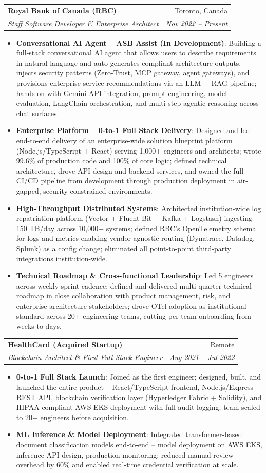 \documentclass[letterpaper,9.5pt]{article}
\makeatletter
\newcommand{\resumeItem}[2]{\item\small{\textbf{#1}{: #2 \vspace{-2pt}}}}
\newcommand{\resumeSubheading}[4]{\vspace{-2pt}\item\begin{tabular*}{0.97\textwidth}{l@{\extracolsep{\fill}}r}\textbf{#1} & #2 \\\textit{\small#3} & \textit{\small #4} \\\end{tabular*}\vspace{-6pt}}
\newcommand{\resumeItemListStart}{\begin{itemize}}
\newcommand{\resumeItemListEnd}{\end{itemize}\vspace{-6pt}}
\makeatother
\begin{document}
  \resumeSubheading
    {Royal Bank of Canada (RBC)}{Toronto, Canada}
    {Staff Software Developer \& Enterprise Architect}{Nov 2022 -- Present}
  \resumeItemListStart
    \resumeItem{Conversational AI Agent -- ASB Assist (In Development)}{Building a full-stack conversational AI agent that allows users to describe requirements in natural language and auto-generates compliant architecture outputs, injects security patterns (Zero-Trust, MCP gateway, agent gateways), and provisions enterprise service recommendations via an LLM + RAG pipeline; hands-on with Gemini API integration, prompt engineering, model evaluation, LangChain orchestration, and multi-step agentic reasoning across chat surfaces.}
    \resumeItem{Enterprise Platform -- 0-to-1 Full Stack Delivery}{Designed and led end-to-end delivery of an enterprise-wide solution blueprint platform (Node.js/TypeScript + React) serving 1,000+ engineers and architects; wrote 99.6\% of production code and 100\% of core logic; defined technical architecture, drove API design and backend services, and owned the full CI/CD pipeline from development through production deployment in air-gapped, security-constrained environments.}
    \resumeItem{High-Throughput Distributed Systems}{Architected institution-wide log repatriation platform (Vector + Fluent Bit + Kafka + Logstash) ingesting 150 TB/day across 10,000+ systems; defined RBC's OpenTelemetry schema for logs and metrics enabling vendor-agnostic routing (Dynatrace, Datadog, Splunk) as a config change; eliminated all point-to-point third-party integrations institution-wide.}
    \resumeItem{Technical Roadmap \& Cross-functional Leadership}{Led 5 engineers across weekly sprint cadence; defined and delivered multi-quarter technical roadmap in close collaboration with product management, risk, and enterprise architecture stakeholders; drove OTel adoption as institutional standard across 20+ engineering teams, cutting per-team onboarding from weeks to days.}
  \resumeItemListEnd

  \resumeSubheading
    {HealthCard (Acquired Startup)}{Remote}
    {Blockchain Architect \& First Full Stack Engineer}{Aug 2021 -- Jul 2022}
  \resumeItemListStart
    \resumeItem{0-to-1 Full Stack Launch}{Joined as the first engineer; designed, built, and launched the entire product -- React/TypeScript frontend, Node.js/Express REST API, blockchain verification layer (Hyperledger Fabric + Solidity), and HIPAA-compliant AWS EKS deployment with full audit logging; team scaled to 20+ engineers before acquisition.}
    \resumeItem{ML Inference \& Model Deployment}{Integrated transformer-based document classification models end-to-end -- model deployment on AWS EKS, inference API design, production monitoring; reduced manual review overhead by 60\% and enabled real-time credential verification at scale.}
  \resumeItemListEnd
\end{document}
